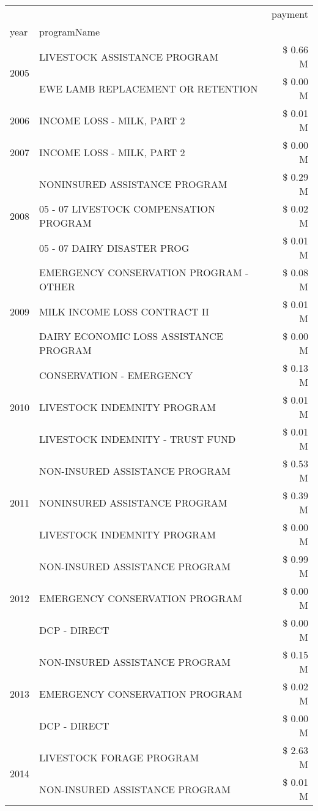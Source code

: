 \begin{tabular}{llr}
\toprule
 &  & payment \\
year & programName &  \\
\midrule
\multirow[t]{2}{*}{2005} & LIVESTOCK ASSISTANCE PROGRAM & \$ 0.66 M \\
 & EWE LAMB REPLACEMENT OR RETENTION & \$ 0.00 M \\
\cline{1-3}
2006 & INCOME LOSS - MILK, PART 2 & \$ 0.01 M \\
\cline{1-3}
2007 & INCOME LOSS - MILK, PART 2 & \$ 0.00 M \\
\cline{1-3}
\multirow[t]{3}{*}{2008} & NONINSURED ASSISTANCE PROGRAM & \$ 0.29 M \\
 & 05 - 07 LIVESTOCK COMPENSATION PROGRAM & \$ 0.02 M \\
 & 05 - 07 DAIRY DISASTER PROG & \$ 0.01 M \\
\cline{1-3}
\multirow[t]{3}{*}{2009} & EMERGENCY CONSERVATION PROGRAM - OTHER & \$ 0.08 M \\
 & MILK INCOME LOSS CONTRACT II & \$ 0.01 M \\
 & DAIRY ECONOMIC LOSS ASSISTANCE PROGRAM & \$ 0.00 M \\
\cline{1-3}
\multirow[t]{3}{*}{2010} & CONSERVATION - EMERGENCY & \$ 0.13 M \\
 & LIVESTOCK INDEMNITY PROGRAM & \$ 0.01 M \\
 & LIVESTOCK INDEMNITY - TRUST FUND & \$ 0.01 M \\
\cline{1-3}
\multirow[t]{3}{*}{2011} & NON-INSURED ASSISTANCE PROGRAM & \$ 0.53 M \\
 & NONINSURED ASSISTANCE PROGRAM & \$ 0.39 M \\
 & LIVESTOCK INDEMNITY PROGRAM & \$ 0.00 M \\
\cline{1-3}
\multirow[t]{3}{*}{2012} & NON-INSURED ASSISTANCE PROGRAM & \$ 0.99 M \\
 & EMERGENCY CONSERVATION PROGRAM & \$ 0.00 M \\
 & DCP - DIRECT & \$ 0.00 M \\
\cline{1-3}
\multirow[t]{3}{*}{2013} & NON-INSURED ASSISTANCE PROGRAM & \$ 0.15 M \\
 & EMERGENCY CONSERVATION PROGRAM & \$ 0.02 M \\
 & DCP - DIRECT & \$ 0.00 M \\
\cline{1-3}
\multirow[t]{3}{*}{2014} & LIVESTOCK FORAGE PROGRAM & \$ 2.63 M \\
 & NON-INSURED ASSISTANCE PROGRAM & \$ 0.01 M \\

\end{tabular}
